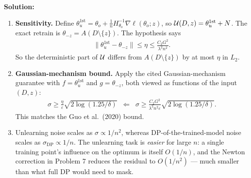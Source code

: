 \documentclass[12pt]{article}
\begin{document}
\begin{enumerate}
\begin{solution}
{\bf Solution:}\\
\begin{enumerate}
    \item \textbf{Sensitivity.} Define $\theta_u^{\mathrm{1st}} = \theta_o + \frac{1}{n}H_{\theta_o}^{-1}\nabla\ell(\theta_o; z)$, so ${\mathcal{U}}(D, z) = \theta_u^{\mathrm{1st}} + N$. The exact retrain is $\theta_{-z} = A(D \setminus \{z\})$. The hypothesis says
    \begin{align*}
        \|\theta_u^{\mathrm{1st}} - \theta_{-z}\| \le \eta \le \frac{C_2 G^2}{\lambda^2 n^2}.
    \end{align*}
    So the deterministic part of ${\mathcal{U}}$ differs from $A(D \setminus \{z\})$ by at most $\eta$ in $L_2$.

    \item \textbf{Gaussian-mechanism bound.} Apply the cited Gaussian-mechanism guarantee with $f = \theta_u^{\mathrm{1st}}$ and $g = \theta_{-z}$, both viewed as functions of the input $(D, z)$:
    \begin{align*}
        \sigma \ge \frac{\eta}{\varepsilon}\sqrt{2\log(1.25/\delta)} \;\;\Longleftarrow\;\; \sigma \ge \frac{C_2 G^2}{\lambda^2 n^2 \varepsilon}\sqrt{2\log(1.25/\delta)}.
    \end{align*}
    This matches the Guo et al.\ (2020) bound.

    \item Unlearning noise scales as $\sigma \propto 1/n^2$, whereas DP-of-the-trained-model noise scales as $\sigma_{\mathrm{DP}} \propto 1/n$. The unlearning task is \emph{easier} for large $n$: a single training point's influence on the optimum is itself $O(1/n)$, and the Newton correction in Problem 7 reduces the residual to $O(1/n^2)$ --- much smaller than what full DP would need to mask.
\end{enumerate}
\end{solution}



\end{enumerate}
\end{document}
